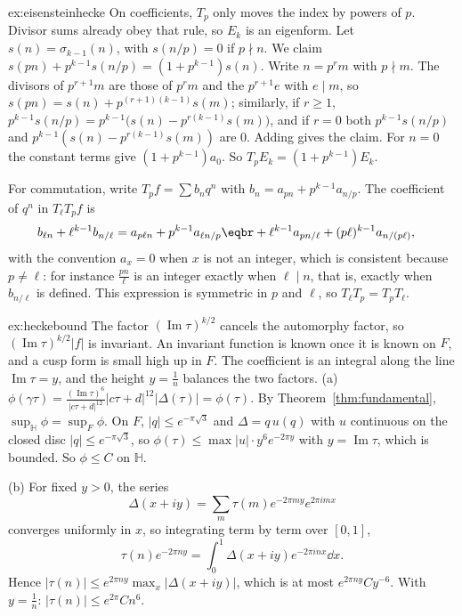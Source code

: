\begin{solution}{ex:eisensteinhecke}
\idea On coefficients, $T_p$ only moves the index by powers of $p$. Divisor sums already obey that rule, so $E_k$ is an eigenform.
\writeup Let $s(n)=\sigma_{k-1}(n)$, with $s(n/p)=0$ if $p\nmid n$. We claim $s(pn)+p^{k-1}s(n/p)=(1+p^{k-1})s(n)$. Write $n=p^rm$ with $p\nmid m$. The divisors of $p^{r+1}m$ are those of $p^rm$ and the $p^{r+1}e$ with $e\mid m$, so
$s(pn)=s(n)+p^{(r+1)(k-1)}s(m)$; similarly, if $r\ge1$, $p^{k-1}s(n/p)=p^{k-1}\bigl(s(n)-p^{r(k-1)}s(m)\bigr)$, and if $r=0$ both $p^{k-1}s(n/p)$ and $p^{k-1}(s(n)-p^{r(k-1)}s(m))$ are $0$. Adding gives the claim. For $n=0$
the constant terms give $(1+p^{k-1})a_0$. So $T_pE_k=(1+p^{k-1})E_k$.

For commutation, write $T_pf=\sum b_nq^n$ with $b_n=a_{pn}+p^{k-1}a_{n/p}$. The coefficient of $q^n$ in $T_\ell T_pf$ is
\[
\begin{aligned}b_{\ell n}+\ell^{k-1}b_{n/\ell}&=a_{p\ell n}+p^{k-1}a_{\ell n/p}\eqbr+\ell^{k-1}a_{pn/\ell}+(p\ell)^{k-1}a_{n/(p\ell)},\end{aligned}
\]
with the convention $a_x=0$ when $x$ is not an integer, which is consistent because $p\ne\ell$: for instance $\frac{pn}\ell$ is an integer exactly when $\ell\mid n$, that is, exactly when $b_{n/\ell}$ is defined.
This expression is symmetric in $p$ and $\ell$, so $T_\ell T_p=T_pT_\ell$.
\end{solution}

\begin{solution}{ex:heckebound}
\idea The factor $(\operatorname{Im}\tau)^{k/2}$ cancels the automorphy factor, so $(\operatorname{Im}\tau)^{k/2}|f|$ is invariant. An invariant function is known once it is known on $F$, and a cusp form is small high up in $F$. The coefficient is an integral along the line $\operatorname{Im}\tau=y$, and the height $y=\frac1n$ balances the two factors.
\writeup (a) $\phi(\gamma\tau)=\frac{(\operatorname{Im}\tau)^6}{|c\tau+d|^{12}}|c\tau+d|^{12}|\Delta(\tau)|=\phi(\tau)$. By Theorem~\ref{thm:fundamental}, $\sup_{\mathbb H}\phi=\sup_F\phi$. On $F$, $|q|\le e^{-\pi\sqrt3}$ and $\Delta=q\,u(q)$ with
$u$ continuous on the closed disc $|q|\le e^{-\pi\sqrt3}$, so $\phi(\tau)\le\max|u|\cdot y^6e^{-2\pi y}$ with $y=\operatorname{Im}\tau$, which is bounded. So $\phi\le C$ on $\mathbb H$.

(b) For fixed $y>0$, the series
\[
\Delta(x+iy)=\sum_m\tau(m)e^{-2\pi my}e^{2\pi imx}
\]
converges uniformly in $x$, so integrating term by term over $[0,1]$,
\[
\tau(n)e^{-2\pi ny}=\int_0^1\Delta(x+iy)e^{-2\pi inx}\dd x.
\]
Hence $|\tau(n)|\le e^{2\pi ny}\max_x|\Delta(x+iy)|$, which is at most $e^{2\pi ny}Cy^{-6}$. With $y=\frac1n$: $|\tau(n)|\le e^{2\pi}Cn^6$.
\end{solution}

